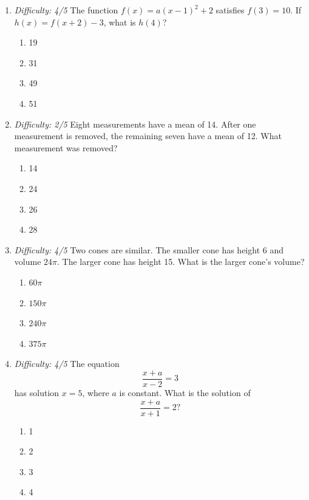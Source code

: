 \documentclass[12pt]{article}
\begin{document}
\begin{enumerate}[leftmargin=*,itemsep=1.2em,topsep=0.8em]
  \item \textit{Difficulty: 4/5} The function $f(x)=a(x-1)^2+2$ satisfies $f(3)=10$. If $h(x)=f(x+2)-3$, what is $h(4)$?
  \begin{enumerate}[label=\Alph*.,itemsep=0pt]
    \item 19 \item 31 \item 49 \item 51
  \end{enumerate}

  \item \textit{Difficulty: 2/5} Eight measurements have a mean of 14. After one measurement is removed, the remaining seven have a mean of 12. What measurement was removed?
  \begin{enumerate}[label=\Alph*.,itemsep=0pt]
    \item 14 \item 24 \item 26 \item 28
  \end{enumerate}

  \item \textit{Difficulty: 4/5} Two cones are similar. The smaller cone has height 6 and volume $24\pi$. The larger cone has height 15. What is the larger cone's volume?
  \begin{enumerate}[label=\Alph*.,itemsep=0pt]
    \item $60\pi$ \item $150\pi$ \item $240\pi$ \item $375\pi$
  \end{enumerate}

  \item \textit{Difficulty: 4/5} The equation
  \[
    \frac{x+a}{x-2}=3
  \]
  has solution $x=5$, where $a$ is constant. What is the solution of
  \[
    \frac{x+a}{x+1}=2?
  \]
  \begin{enumerate}[label=\Alph*.,itemsep=0pt]
    \item 1 \item 2 \item 3 \item 4
  \end{enumerate}
\end{enumerate}
\end{document}
